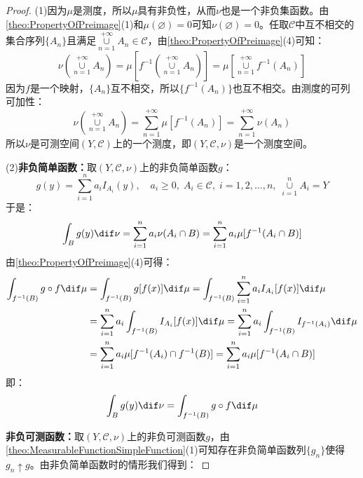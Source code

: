 \begin{proof}
	(1)因为$\mu$是测度，所以$\mu$具有非负性，从而$\nu$也是一个非负集函数。由\cref{theo:PropertyOfPreimage}(1)和$\mu(\varnothing)=0$可知$\nu(\varnothing)=0$。任取$\mathscr{C}$中互不相交的集合序列$\{A_n\}$且满足$\underset{n=1}{\overset{+\infty}{\cup}}A_n\in\mathscr{C}$，由\cref{theo:PropertyOfPreimage}(4)可知：
	\begin{equation*}
		\nu\left(\underset{n=1}{\overset{+\infty}{\cup}}A_n\right)=\mu\left[f^{-1}\left(\underset{n=1}{\overset{+\infty}{\cup}}A_n\right)\right]=\mu\left[\underset{n=1}{\overset{+\infty}{\cup}}f^{-1}(A_n)\right]
	\end{equation*}
	因为$f$是一个映射，$\{A_n\}$互不相交，所以$\{f^{-1}(A_n)\}$也互不相交。由测度的可列可加性：
	\begin{equation*}
		\nu\left(\underset{n=1}{\overset{+\infty}{\cup}}A_n\right)=\sum_{n=1}^{+\infty}\mu[f^{-1}(A_n)]=\sum_{n=1}^{+\infty}\nu(A_n)
	\end{equation*}
	所以$\nu$是可测空间$(Y,\mathscr{C})$上的一个测度，即$(Y,\mathscr{C},\nu)$是一个测度空间。\par
	(2)\textbf{非负简单函数：}取$(Y,\mathscr{C},\nu)$上的非负简单函数$g$：
	\begin{equation*}
		g(y)=\sum_{i=1}^{n}a_iI_{A_i}(y),\quad a_i\geqslant0,\;A_i\in\mathscr{C},\;i=1,2,\dots,n,\;\underset{i=1}{\overset{n}{\cup}}A_i=Y
	\end{equation*}
	于是：
	\begin{equation*}
		\int_{B}g(y)\dif\nu=\sum_{i=1}^{n}a_i\nu(A_i\cap B)=\sum_{i=1}^{n}a_i\mu[f^{-1}(A_i\cap B)]
	\end{equation*}
	由\cref{theo:PropertyOfPreimage}(4)可得：
	\begin{align*}
		\int_{f^{-1}(B)}g\circ f\dif\mu&=\int_{f^{-1}(B)}g[f(x)]\dif\mu=\int_{f^{-1}(B)}\sum_{i=1}^{n}a_iI_{A_i}[f(x)]\dif\mu \\
		&=\sum_{i=1}^{n}a_i\int_{f^{-1}(B)}I_{A_i}[f(x)]\dif\mu=\sum_{i=1}^{n}a_i\int_{f^{-1}(B)}I_{f^{-1}(A_i)}\dif\mu \\
		&=\sum_{i=1}^{n}a_i\mu[f^{-1}(A_i)\cap f^{-1}(B)]=\sum_{i=1}^{n}a_i\mu[f^{-1}(A_i\cap B)]
	\end{align*}
	即：
	\begin{equation*}
		\int_{B}g(y)\dif\nu=\int_{f^{-1}(B)}g\circ f\dif\mu
	\end{equation*}\par
	\textbf{非负可测函数：}取$(Y,\mathscr{C},\nu)$上的非负可测函数$g$，由\cref{theo:MeasurableFunctionSimpleFunction}(1)可知存在非负简单函数列$\{g_n\}$使得$g_n\uparrow g$。由非负简单函数时的情形我们得到：

\end{proof}
